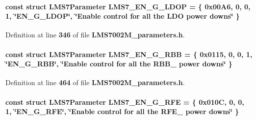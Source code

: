\paragraph[{L\+M\+S7\+\_\+\+E\+N\+\_\+\+G\+\_\+\+L\+D\+OP}]{\setlength{\rightskip}{0pt plus 5cm}const struct {\bf L\+M\+S7\+Parameter} L\+M\+S7\+\_\+\+E\+N\+\_\+\+G\+\_\+\+L\+D\+OP = \{ 0x00\+A6, 0, 0, 1, \char`\"{}\+E\+N\+\_\+\+G\+\_\+\+L\+D\+O\+P\char`\"{}, \char`\"{}\+Enable control for all the L\+D\+O power downs\char`\"{} \}\hspace{0.3cm}{\ttfamily [static]}}\label{LMS7002M__parameters_8h_a99bb314718f9df126bc621e1df6c2afd}


Definition at line {\bf 346} of file {\bf L\+M\+S7002\+M\+\_\+parameters.\+h}.

\paragraph[{L\+M\+S7\+\_\+\+E\+N\+\_\+\+G\+\_\+\+R\+BB}]{\setlength{\rightskip}{0pt plus 5cm}const struct {\bf L\+M\+S7\+Parameter} L\+M\+S7\+\_\+\+E\+N\+\_\+\+G\+\_\+\+R\+BB = \{ 0x0115, 0, 0, 1, \char`\"{}\+E\+N\+\_\+\+G\+\_\+\+R\+B\+B\char`\"{}, \char`\"{}\+Enable control for all the R\+B\+B\+\_ power downs\char`\"{} \}\hspace{0.3cm}{\ttfamily [static]}}\label{LMS7002M__parameters_8h_a1c1f3086a6b97a2d76e27d699c74ec99}


Definition at line {\bf 464} of file {\bf L\+M\+S7002\+M\+\_\+parameters.\+h}.

\paragraph[{L\+M\+S7\+\_\+\+E\+N\+\_\+\+G\+\_\+\+R\+FE}]{\setlength{\rightskip}{0pt plus 5cm}const struct {\bf L\+M\+S7\+Parameter} L\+M\+S7\+\_\+\+E\+N\+\_\+\+G\+\_\+\+R\+FE = \{ 0x010\+C, 0, 0, 1, \char`\"{}\+E\+N\+\_\+\+G\+\_\+\+R\+F\+E\char`\"{}, \char`\"{}\+Enable control for all the R\+F\+E\+\_ power downs\char`\"{} \}\hspace{0.3cm}{\ttfamily [static]}}\label{LMS7002M__parameters_8h_a952fbb6fbafe02722b37189c65dacb60}


